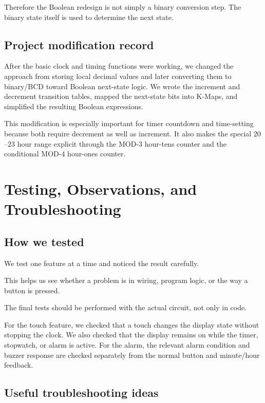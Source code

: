 \documentclass[12pt,letterpaper]{article}
\begin{document}
Therefore the Boolean redesign is not simply a binary conversion step.
The binary state itself is used to determine the next state.

\subsection{Project modification record}

After the basic clock and timing functions were working, we changed the
approach from storing local decimal values and later converting them to
binary/BCD toward Boolean next-state logic. We wrote the increment and
decrement transition tables, mapped the next-state bits into K-Maps, and
simplified the resulting Boolean expressions.

This modification is especially important for timer countdown and
time-setting because both require decrement as well as increment. It also
makes the special \(20\)--\(23\) hour range explicit through the MOD-3
hour-tens counter and the conditional MOD-4 hour-ones counter.

\section{Testing, Observations, and Troubleshooting}

\subsection{How we tested}

We test one feature at a time
and noticed the result carefully.

This helps us see whether a problem
is in wiring,
program logic,
or the way a button is pressed.

The final tests should be performed
with the actual circuit,
not only in code.

For the touch feature, we checked that a touch changes the display state
without stopping the clock. We also checked that the display remains on
while the timer, stopwatch, or alarm is active. For the alarm, the relevant
alarm condition and buzzer response are checked separately from the normal
button and minute/hour feedback.

\subsection{Useful troubleshooting ideas}
\end{document}
